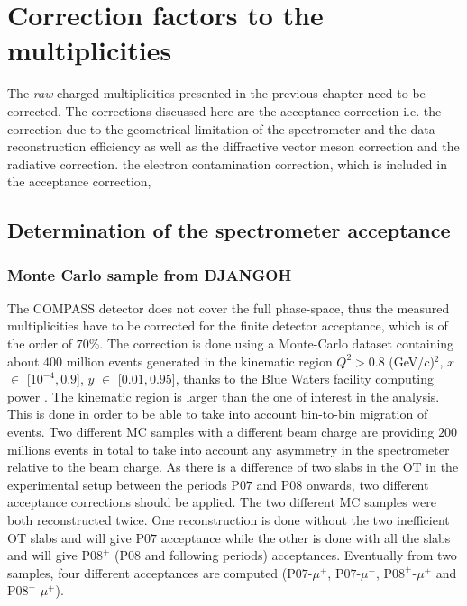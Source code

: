 
\chapter{Correction factors to the multiplicities} %

\label{ch:CF} %


The \textit{raw} charged multiplicities presented in the previous chapter need to be corrected. The corrections discussed here are the acceptance correction i.e. the correction due to the geometrical limitation of the spectrometer and the data reconstruction efficiency as well as the diffractive vector meson correction and the radiative correction. the electron contamination correction, which is included in the acceptance correction,

\section{Determination of the spectrometer acceptance} \label{sec:Acc}

\subsection{Monte Carlo sample from DJANGOH}

The COMPASS detector does not cover the full phase-space, thus the measured multiplicities have
to be corrected for the finite detector acceptance, which is of the order of $70$\%. The correction is
done using a Monte-Carlo dataset containing about $400$ million events generated in the kinematic
region $Q^2 > 0.8$ (GeV/$c$)$^2$, $x$ $\in$ [$10^{-4},0.9$], $y$ $\in$ [$0.01,0.95$], thanks to the Blue Waters facility computing power \cite{Bode2013,Kramer2015}. The kinematic region is larger than the one of interest in the analysis. This is done in order to be able to take into account bin-to-bin migration of events. Two different MC samples with a different beam charge are providing $200$ millions events in total to take into account any asymmetry in the spectrometer relative to the beam charge. As there is a difference of two slabs in the OT in the experimental setup between the periods P$07$ and P$08$ onwards, two different acceptance corrections should be applied. The two different MC samples were both reconstructed twice. One reconstruction is done without the two inefficient OT slabs and will give P$07$ acceptance while the other is done with all the slabs and will give P$08^+$ (P08 and following periods) acceptances. Eventually from two samples, four different acceptances are computed (P$07$-$\mu^+$, P$07$-$\mu^-$, P$08^+$-$\mu^+$ and P$08^+$-$\mu^+$).


